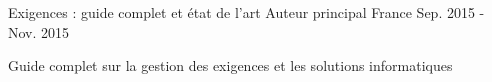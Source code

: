 

\begin{cventries}

  \cventry
    {Exigences : guide complet et état de l'art} %
    {Auteur principal} %
    {France} %
    {Sep. 2015 - Nov. 2015} %
    {
      \begin{cvitems} %
        \item {Guide complet sur la gestion des exigences et les solutions informatiques}
      \end{cvitems}
    }

\end{cventries}
